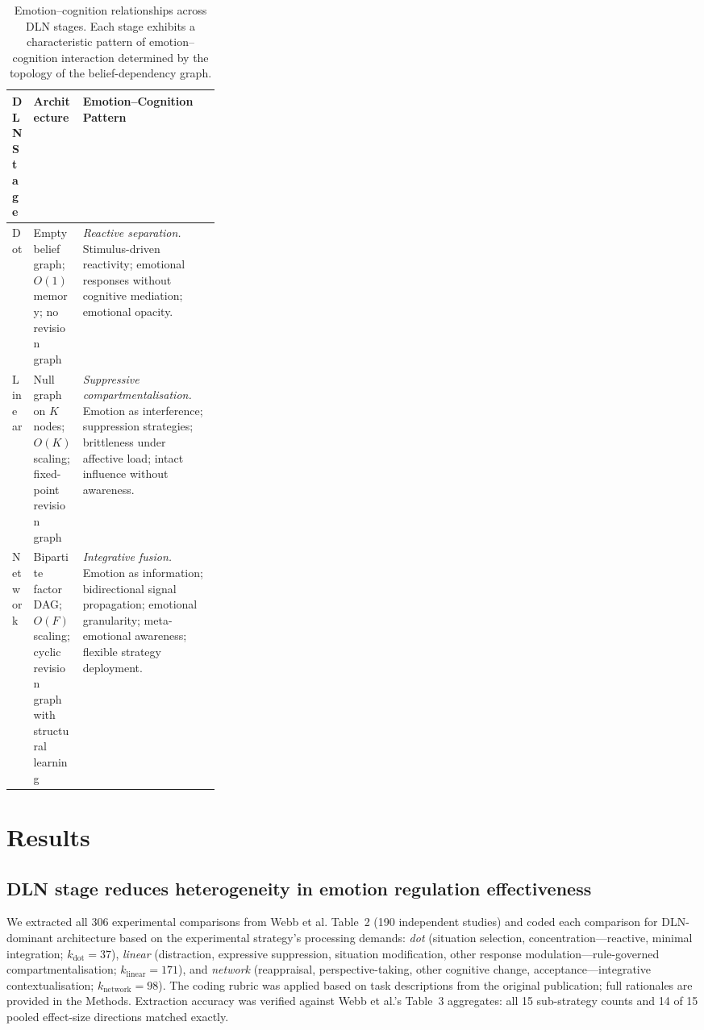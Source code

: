 \documentclass[11pt]{article}
\begin{document}
\begin{table}[ht]
\centering
\small
\caption{Emotion--cognition relationships across DLN stages.
Each stage exhibits a characteristic pattern of emotion--cognition
interaction determined by the topology of the belief-dependency graph.}
\label{tab:dln_stages}
\begin{tabularx}{\linewidth}{p{0.10\linewidth} p{0.20\linewidth} X}
\toprule
\textbf{DLN Stage} & \textbf{Architecture} & \textbf{Emotion--Cognition Pattern} \\
\midrule
Dot & Empty belief graph; $O(1)$ memory; no revision graph &
\textit{Reactive separation.} Stimulus-driven reactivity; emotional
responses without cognitive mediation; emotional opacity. \\[6pt]
Linear & Null graph on $K$ nodes; $O(K)$ scaling; fixed-point
revision graph &
\textit{Suppressive compartmentalisation.} Emotion as interference;
suppression strategies; brittleness under affective load; intact
influence without awareness. \\[6pt]
Network & Bipartite factor DAG; $O(F)$ scaling; cyclic revision graph
with structural learning &
\textit{Integrative fusion.} Emotion as information; bidirectional
signal propagation; emotional granularity; meta-emotional awareness;
flexible strategy deployment. \\
\bottomrule
\end{tabularx}
\end{table}


\section{Results}

\subsection{DLN stage reduces heterogeneity in emotion regulation
effectiveness}

We extracted all 306 experimental comparisons from Webb et
al.\cite{Webb2012} Table~2 (190 independent studies) and coded each
comparison for DLN-dominant architecture based on the experimental
strategy's processing demands: \textit{dot} (situation selection,
concentration---reactive, minimal integration;
$k_{\text{dot}} = 37$), \textit{linear} (distraction, expressive
suppression, situation modification, other response
modulation---rule-governed compartmentalisation;
$k_{\text{linear}} = 171$), and \textit{network} (reappraisal,
perspective-taking, other cognitive change,
acceptance---integrative contextualisation;
$k_{\text{network}} = 98$). The coding rubric was applied based on task
descriptions from the original publication; full rationales are provided
in the Methods. Extraction accuracy was verified against Webb et al.'s
Table~3 aggregates: all 15 sub-strategy counts and 14 of 15 pooled
effect-size directions matched exactly.
\end{document}
